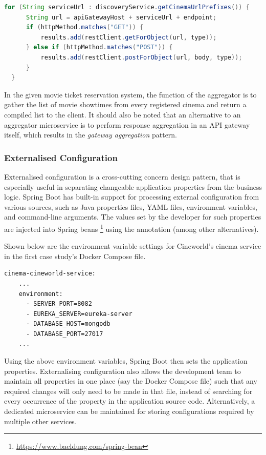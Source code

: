 \begin{lstlisting}[language=Java, caption=Snippet from \code{AggregatorService.java}.]
  for (String serviceUrl : discoveryService.getCinemaUrlPrefixes()) {
      String url = apiGatewayHost + serviceUrl + endpoint;
      if (httpMethod.matches("GET")) {
          results.add(restClient.getForObject(url, type));
      } else if (httpMethod.matches("POST")) {
          results.add(restClient.postForObject(url, body, type));
      }
  }
\end{lstlisting}

In the given movie ticket reservation system, the function of the aggregator is to gather the list of movie showtimes from every registered cinema and return a compiled list to the client. It should also be noted that an alternative to an aggregator microservice is to perform response aggregation in an API gateway itself, which results in the \textit{gateway aggregation} pattern.

\subsubsection{Externalised Configuration}

Externalised configuration is a cross-cutting concern design pattern, that is especially useful in separating changeable application properties from the business logic. Spring Boot has built-in support for processing external configuration from various sources, such as Java properties files, YAML files, environment variables, and command-line arguments. The values set by the developer for such properties are injected into Spring beans \footnote{\url{https://www.baeldung.com/spring-bean}} using the  annotation (among other alternatives).

Shown below are the environment variable settings for Cineworld's cinema service in the first case study's Docker Compose file.
\begin{lstlisting}[caption=Snippet from \code{docker-compose.yml}.]
  cinema-cineworld-service:
    ...
    environment:
      - SERVER_PORT=8082
      - EUREKA_SERVER=eureka-server
      - DATABASE_HOST=mongodb
      - DATABASE_PORT=27017
    ...
\end{lstlisting}

Using the above environment variables, Spring Boot then sets the application properties. Externalising configuration also allows the development team to maintain all properties in one place (say the Docker Compose file) such that any required changes will only need to be made in that file, instead of searching for every occurrence of the property in the application source code. Alternatively, a dedicated microservice can be maintained for storing configurations required by multiple other services.


